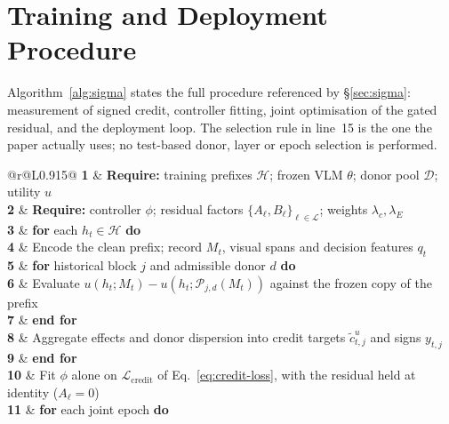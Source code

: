 \documentclass{article}
\newcommand{\method}{\textsc{Sigma}}
\begin{document}
\section{Training and Deployment Procedure}
\label{app:algorithm}
Algorithm~\ref{alg:sigma} states the full procedure referenced by \S\ref{sec:sigma}: measurement of signed credit, controller fitting, joint optimisation of the gated residual, and the deployment loop. The selection rule in line~15 is the one the paper actually uses; no test-based donor, layer or epoch selection is performed.

\begin{algorithm}[H]
\caption{\method: learning memory adaptation from interventions}
\label{alg:sigma}
\small
\setlength{\tabcolsep}{0pt}
\renewcommand{\arraystretch}{1.16}
\begin{tabular}{@{}r@{\hspace{0.55em}}L{0.915\linewidth}@{}}
\textbf{1} & \textbf{Require:} training prefixes $\mathcal H$; frozen VLM $\theta$; donor pool $\mathcal D$; utility $u$\\
\textbf{2} & \textbf{Require:} controller $\phi$; residual factors $\{A_\ell,B_\ell\}_{\ell\in\mathcal L}$; weights $\lambda_c,\lambda_E$\\
\textbf{3} & \textbf{for} each $h_t\in\mathcal H$ \textbf{do}\\
\textbf{4} & \hspace{1.0em}Encode the clean prefix; record $M_t$, visual spans and decision features $q_t$\\
\textbf{5} & \hspace{1.0em}\textbf{for} historical block $j$ and admissible donor $d$ \textbf{do}\\
\textbf{6} & \hspace{2.0em}Evaluate $u(h_t;M_t)-u(h_t;\mathcal P_{j,d}(M_t))$ against the frozen copy of the prefix\\
\textbf{7} & \hspace{1.0em}\textbf{end for}\\
\textbf{8} & \hspace{1.0em}Aggregate effects and donor dispersion into credit targets $\tilde c^u_{t,j}$ and signs $y_{t,j}$\\
\textbf{9} & \textbf{end for}\\
\textbf{10} & Fit $\phi$ alone on $\mathcal L_{\mathrm{credit}}$ of Eq.~\eqref{eq:credit-loss}, with the residual held at identity ($A_\ell=0$)\\
\textbf{11} & \textbf{for} each joint epoch \textbf{do}\\

\end{tabular}
\end{algorithm}
\end{document}
